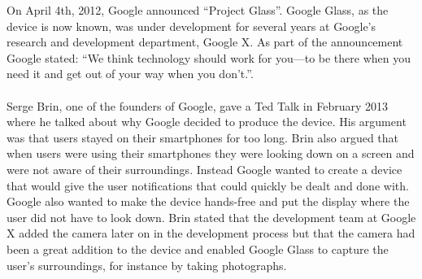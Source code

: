 %
%
%
%
%
%
%
%
On April 4th, 2012, Google announced ``Project Glass''.\cite{GoogleGlassConcept} Google Glass, as the device is now known, was under development for several years at Google's research and development department, Google X. As part of the announcement Google stated:  ``We think technology should work for you---to be there when you need it and get out of your way when you don't.''.\cite{GoogleGlassAnnouncement}
\\
\\
Serge Brin, one of the founders of Google, gave a Ted Talk in February 2013\cite{tedtalkWhyGlass} where he talked about why Google decided to produce the device. His argument was that users stayed on their smartphones for too long. Brin also argued that when users were using their smartphones they were looking down on a screen and were not aware of their surroundings. Instead Google wanted to create a device that would give the user notifications that could quickly be dealt and done with. Google also wanted to make the device hands-free and put the display where the user did not have to look down. Brin stated that the development team at Google X added the camera later on in the development process but that the camera had been a great addition to the device and enabled Google Glass to capture the user's surroundings, for instance by taking photographs.
